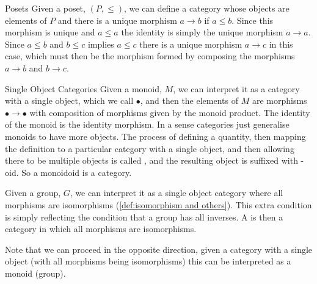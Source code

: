 \documentclass[fleqn]{NotesClass}
\begin{document}
    \begin{exm}{Posets}{}
        Given a poset, \((P, \le)\), we can define a category whose objects are elements of \(P\) and there is a unique morphism \(a \to b\) if \(a \le b\).
        Since this morphism is unique and \(a \le a\) the identity is simply the unique morphism \(a \to a\).
        Since \(a \le b\) and \(b \le c\) implies \(a \le c\) there is a unique morphism \(a \to c\) in this case, which must then be the morphism formed by composing the morphisms \(a \to b\) and \(b \to c\).
    \end{exm}
    
    \begin{exm}{Single Object Categories}{}
        Given a monoid, \(M\), we can interpret it as a category with a single object, which we call \(\bullet\), and then the elements of \(M\) are morphisms \(\bullet \to \bullet\) with composition of morphisms given by the monoid product.
        The identity of the monoid is the identity morphism.
        In a sense categories just generalise monoids to have more objects.
        The process of defining a quantity, then mapping the definition to a particular category with a single object, and then allowing there to be multiple objects is called , and the resulting object is suffixed with -oid.
        So a monoidoid is a category.
        
        Given a group, \(G\), we can interpret it as a single object category where all morphisms are isomorphisms (\cref{def:isomorphism and others}).
        This extra condition is simply reflecting the condition that a group has all inverses.
        A  is then a category in which all morphisms are isomorphisms.
        
        Note that we can proceed in the opposite direction, given a category with a single object (with all morphisms being isomorphisms) this can be interpreted as a monoid (group).
    \end{exm}
    
\end{document}
